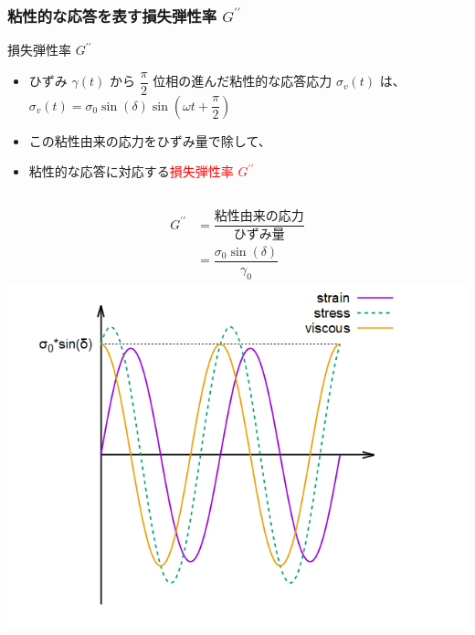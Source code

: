 \documentclass[12pt, dvipdfmx]{beamer}
\begin{document}
\begin{frame}
    \frametitle{粘性的な応答を表す損失弾性率 $G^{\prime\prime}$}
		
		\begin{block}{損失弾性率 $G^{\prime\prime}$}
			\begin{itemize}
				\item ひずみ $\gamma(t)$ から $\dfrac{\pi}{2}$ 位相の進んだ粘性的な応答応力 $\sigma_v(t)$ は、
				$\sigma_v(t) = \sigma_0 \sin(\delta)\sin(\omega t + \dfrac{\pi}{2})$
				\item この粘性由来の応力をひずみ量で除して、
				\item 粘性的な応答に対応する\textcolor{red}{損失弾性率 $G^{\prime\prime}$}
			\end{itemize}
			\begin{columns}[c, onlytextwidth]
						\begin{align*}
							G^{\prime \prime} &= \dfrac{\text{粘性由来の応力}}{\text{ひずみ量}} \\
							&= \dfrac{\sigma_0 \sin(\delta)}{\gamma_0}
						\end{align*}
					\centering
					\includegraphics[width=.9\textwidth]{dynamic_rheo/dyn_rheo_visco.png}
			\end{columns}
		\end{block}
\end{frame}
\end{document}
